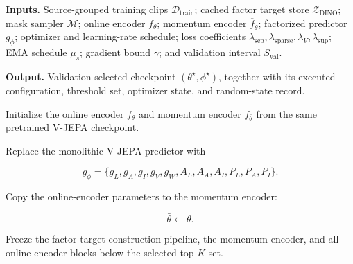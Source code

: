 \begin{tcolorbox}[
    enhanced jigsaw,
    breakable,
    colback=AlgBackground,
    colframe=AlgBorder,
    colbacktitle=AlgTitleBackground,
    coltitle=AlgAccent,
    fonttitle=\bfseries\small,
    title={
        Algorithm~\thefactoralgorithm:
        Executed FactorJEPA Training Procedure
    },
    title after break={
        Algorithm~\thefactoralgorithm\ (continued):
        Executed FactorJEPA Training Procedure
    },
    boxrule=0.55pt,
    arc=1.2mm,
    outer arc=1.2mm,
    left=5pt,
    right=5pt,
    top=5pt,
    bottom=5pt,
    before skip=8pt,
    after skip=8pt,
    pad at break*=2mm,
    fontupper=\footnotesize
]

\textbf{Inputs.}
Source-grouped training clips
\(\mathcal D_{\mathrm{train}}\);
cached factor target store
\(\mathcal Z_{\mathrm{DINO}}\);
mask sampler \(\mathcal M\);
online encoder \(f_\theta\);
momentum encoder \(\overline f_{\bar\theta}\);
factorized predictor \(g_\phi\);
optimizer and learning-rate schedule;
loss coefficients
\(\lambda_{\mathrm{sep}},
\lambda_{\mathrm{sparse}},
\lambda_V,
\lambda_{\mathrm{sup}}\);
EMA schedule \(\mu_s\);
gradient bound \(\gamma\);
and validation interval \(S_{\mathrm{val}}\).

\smallskip

\textbf{Output.}
Validation-selected checkpoint
\((\theta^\star,\phi^\star)\), together with its executed
configuration, threshold set, optimizer state, and random-state record.

\begin{algsteps}


\item
Initialize the online encoder \(f_\theta\) and momentum encoder
\(\overline f_{\bar\theta}\) from the same pretrained V-JEPA
checkpoint.

\item
Replace the monolithic V-JEPA predictor with

\[
g_\phi
=
\{
g_L,g_A,g_I,g_V,g_W,
A_L,A_A,A_I,
P_L,P_A,P_I
\}.
\]

\item
Copy the online-encoder parameters to the momentum encoder:

\[
\bar\theta\gets\theta.
\]

\item
Freeze the factor target-construction pipeline, the momentum encoder,
and all online-encoder blocks below the selected top-\(K\) set.


\end{algsteps}
\end{tcolorbox}
